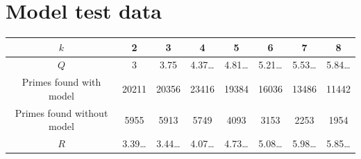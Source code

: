 \documentclass{article}
\begin{document}
\section{Model test data}

\centering
\begin{tabular}{|c|c|c|c|c|c|c|c|}
	\hline
	\(k\)	&2	&3	&4	&5	&6	&7	&8 \\
	\hline
	\(Q\)	&3	&3.75	&4.37\ldots	&4.81\ldots	&5.21\ldots	&5.53\ldots	&5.84\ldots \\
	\hline
	Primes found with model	&20211	&20356	&23416	&19384	&16036	&13486	&11442 \\
	\hline
	Primes found without model	&5955	&5913	&5749	&4093	&3153	&2253	&1954 \\
	\hline
	\(R\)	&3.39\ldots	&3.44\ldots	&4.07\ldots	&4.73\ldots	&5.08\ldots	&5.98\ldots	&5.85\ldots \\
	\hline
\end{tabular}
\end{document}
